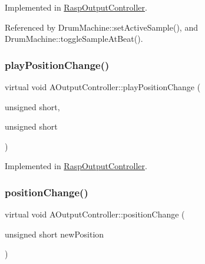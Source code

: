Implemented in \hyperlink{class_rasp_output_controller_af0304196681872f9c1f6d6f2e2db14a6}{Rasp\+Output\+Controller}.



Referenced by Drum\+Machine\+::set\+Active\+Sample(), and Drum\+Machine\+::toggle\+Sample\+At\+Beat().

\mbox{\label{class_a_output_controller_a15c1300df5606bf7d4838b41a45c31e3}} 
\subsubsection{\texorpdfstring{play\+Position\+Change()}{playPositionChange()}\hspace{0.1cm}{\footnotesize\ttfamily [2/2]}}
{\footnotesize\ttfamily virtual void A\+Output\+Controller\+::play\+Position\+Change (\begin{DoxyParamCaption}\item[{unsigned}]{short,  }\item[{unsigned}]{short }\end{DoxyParamCaption})\hspace{0.3cm}{\ttfamily [pure virtual]}}



Implemented in \hyperlink{class_rasp_output_controller_a0778395ee8ec044d04fbfcb2f3b2eb04}{Rasp\+Output\+Controller}.

\mbox{\label{class_a_output_controller_a5a818a40e2911411d378032b8b2fb6c8}} 
\subsubsection{\texorpdfstring{position\+Change()}{positionChange()}}
{\footnotesize\ttfamily virtual void A\+Output\+Controller\+::position\+Change (\begin{DoxyParamCaption}\item[{unsigned short}]{new\+Position }\end{DoxyParamCaption})\hspace{0.3cm}{\ttfamily [pure virtual]}}



